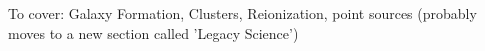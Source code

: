 \documentclass[PICOReport.tex]{subfiles}
\begin{document}
To cover: Galaxy Formation, Clusters, Reionization, point sources (probably moves to a new section called 'Legacy Science')
\end{document}
